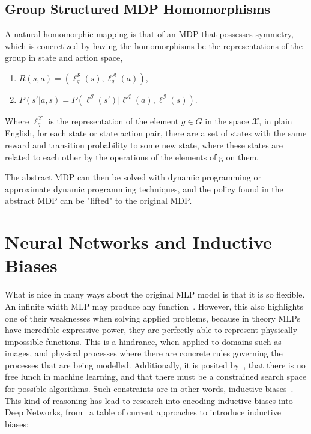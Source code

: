 \subsection{Group Structured MDP Homomorphisms}
A natural homomorphic mapping is that of an MDP that possesses symmetry, which is concretized by having the homomorphisms be the representations of the group in state and action space,
\begin{enumerate}
	\item $R(s, a) = (\ell^\mathcal{S}_g(s), \ell^\mathcal{A}_g(a))$,
	\item $P(s'| a, s) =P(\ell^\mathcal{S}(s')| \ell^\mathcal{A}(a), \ell^\mathcal{S}(s))$.
\end{enumerate}
Where $\ell_g^\mathcal{X}$ is the representation of the element $g \in G$ in the space $\mathcal{X}$, in plain English, for each state or state action pair, there are a set of states with the same reward and transition probability to some new state, where these states are related to each other by the operations of the elements of g on them.



The abstract MDP can then be solved with dynamic programming or approximate dynamic programming techniques\cite{van2020plannable, rezaei2022continuous}, and the policy found in the abstract MDP can be "lifted" to the original MDP.

\section{Neural Networks and Inductive Biases}

What is nice in many ways about the original MLP model is that it is so flexible. An infinite width MLP may produce any function~\cite{hornik1991approximation}. However, this also highlights one of their weaknesses when solving applied problems, because in theory MLPs have incredible expressive power, they are perfectly able to represent physically impossible functions. This is a hindrance, when applied to domains such as images, and physical processes where there are concrete rules governing the processes that are being modelled. Additionally, it is posited by~\cite{wolpert1995no}, that there is no free lunch in machine learning, and that there must be a constrained search space for possible algorithms. Such constraints are in other words, inductive biases~\cite{baxter2000model}. This kind of reasoning has lead to research into encoding inductive biases into Deep Networks, from~\cite{goyal2022inductive} a table of current approaches to introduce inductive biases;


